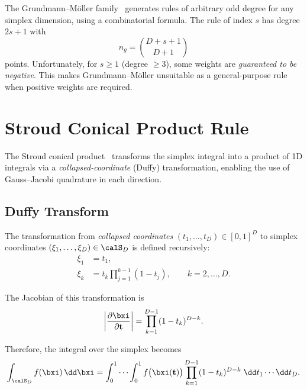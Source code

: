 The Grundmann--M\"oller family~\cite{GrundmannMoller1978} generates rules of
arbitrary odd degree for any simplex dimension, using a combinatorial formula.
The rule of index $s$ has degree $2s+1$ with
\[
  n_g = \binom{D + s + 1}{D + 1}
\]
points.  Unfortunately, for $s \ge 1$ (degree $\ge 3$), some weights are
\emph{guaranteed to be negative}.  This makes Grundmann--M\"oller unsuitable
as a general-purpose rule when positive weights are required.


\section{Stroud Conical Product Rule}
\label{sec:conical_product}

The Stroud conical product~\cite{Stroud1971,Duffy1982} transforms the simplex
integral into a product of 1D integrals via a \emph{collapsed-coordinate}
(Duffy) transformation, enabling the use of Gauss--Jacobi quadrature in each
direction.


\subsection{Duffy Transform}
\label{sec:duffy}

The transformation from \emph{collapsed coordinates}
$(t_1, \dots, t_D) \in [0,1]^D$ to simplex coordinates
$(\xi_1, \dots, \xi_D) \in \calS_D$ is defined recursively:
\begin{equation}
  \boxed{
  \begin{aligned}
    \xi_1 &= t_1, \\
    \xi_k &= t_k \prod_{j=1}^{k-1}(1 - t_j), \qquad k = 2, \dots, D.
  \end{aligned}}
  \label{eq:duffy_transform}
\end{equation}

The Jacobian of this transformation is
\begin{equation}
  \left|\frac{\partial\bxi}{\partial\mathbf{t}}\right|
  = \prod_{k=1}^{D-1} (1 - t_k)^{D-k}.
  \label{eq:duffy_jacobian}
\end{equation}

Therefore, the integral over the simplex becomes
\begin{equation}
  \int_{\calS_D} f(\bxi)\,\dd\bxi
  = \int_0^1 \cdots \int_0^1
    f\bigl(\bxi(\mathbf{t})\bigr)
    \prod_{k=1}^{D-1} (1 - t_k)^{D-k}
    \;\dd t_1 \cdots \dd t_D.
  \label{eq:duffy_integral}
\end{equation}


